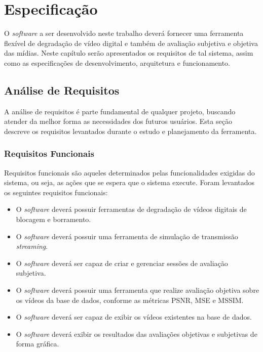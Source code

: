 
\chapter{Especificação} %

O \emph{software} a ser desenvolvido neste trabalho deverá fornecer uma ferramenta flexível de degradação de vídeo digital e também de avaliação subjetiva e objetiva das mídias.
Neste capítulo serão apresentados os requisitos de tal sistema, assim como as especificações de desenvolvimento, arquitetura e funcionamento.

\section{Análise de Requisitos}

A análise de requisitos é parte fundamental de qualquer projeto, buscando atender da melhor forma as necessidades dos futuros usuários.
Esta seção descreve os requisitos levantados durante o estudo e planejamento da ferramenta.

\subsection{Requisitos Funcionais}

Requisitos funcionais são aqueles determinados pelas funcionalidades exigidas do sistema, ou seja, as ações que se espera que o sistema execute. 
Foram levantados os seguintes requisitos funcionais:

\begin{itemize}
	\item O \emph{software} deverá possuir ferramentas de degradação de vídeos digitais de blocagem e borramento.
	\item O \emph{software} deverá possuir uma ferramenta de simulação de transmissão \emph{streaming}.
	\item O \emph{software} deverá ser capaz de criar e gerenciar sessões de avaliação subjetiva.
	\item O \emph{software} deverá possuir uma ferramenta que realize avaliação objetiva sobre os vídeos da base de dados, conforme as métricas PSNR, MSE e MSSIM.
	\item O \emph{software} deverá ser capaz de exibir os vídeos existentes na base de dados.
	\item O \emph{software} deverá exibir os resultados das avaliações objetivas e subjetivas de forma gráfica.
\end{itemize}

